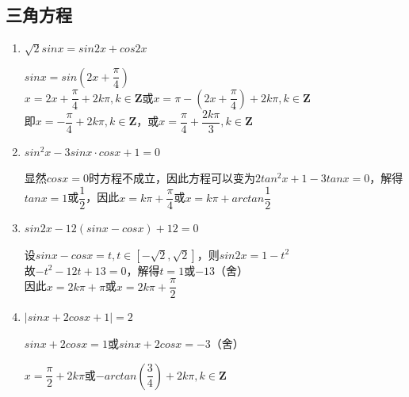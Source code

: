 \subsection*{三角方程}
\begin{enumerate}
    \item $\sqrt{2} sinx = sin2x + cos2x$
    \begin{jieda}
        $sinx = sin(2x+\dfrac{\pi}{4})$ \\
        $x = 2x+\dfrac{\pi}{4} + 2k\pi, k \in \mathbf{Z}$或$x = \pi - (2x+\dfrac{\pi}{4}) + 2k\pi, k \in \mathbf{Z}$ \\
        即$x = -\dfrac{\pi}{4} + 2k\pi, k \in \mathbf{Z}$，或$x = \dfrac{\pi}{4} + \dfrac{2k\pi}{3}, k \in \mathbf{Z}$
    \end{jieda}

    \item $sin^2x - 3sinx\cdot cosx + 1 = 0$
    \begin{jieda}
        显然$cosx = 0$时方程不成立，因此方程可以变为$2tan^2x + 1 - 3tanx = 0$，解得$tanx = 1$或$\dfrac{1}{2}$，因此$x = k\pi + \dfrac{\pi}{4}$或$x = k\pi + arctan\dfrac{1}{2}$
    \end{jieda}

    \item $sin2x - 12(sinx - cosx) + 12 = 0$
    \begin{jieda}
        设$sinx - cosx = t, t \in [-\sqrt{2}, \sqrt{2}]$，则$sin2x = 1 - t^2$ \\
        故$- t^2 - 12t + 13 = 0$，解得$t = 1$或$-13$（舍）\\
        因此$x = 2k\pi + \pi$或$x = 2k\pi + \dfrac{\pi}{2}$
    \end{jieda}
    
    \item $|sinx + 2cosx +1| = 2$
    \begin{jieda}
        $sinx + 2cosx = 1$或$sinx+2cosx = -3$（舍）
        
        $x = \dfrac{\pi}{2}+2k\pi$或$-arctan\left(\dfrac{3}{4}\right)+2k\pi, k \in \mathbf{Z}$
    \end{jieda}
\end{enumerate}

